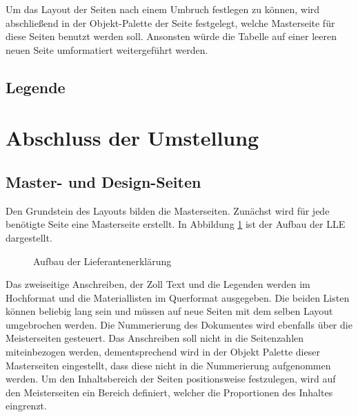 {\begin{figure}[ht]
\end{figure}

Um das Layout der Seiten nach einem Umbruch festlegen zu können, wird abschließend in der Objekt-Palette der Seite festgelegt, welche Masterseite für diese Seiten benutzt werden soll. Ansonsten würde die Tabelle auf einer leeren neuen Seite umformatiert weitergeführt werden.

\FloatBarrier
\subsection{Legende}


\section{Abschluss der Umstellung}




\FloatBarrier
\subsection{Master- und Design-Seiten}
\label{ch:tab}

Den Grundstein des Layouts bilden die Masterseiten. Zunächst wird für jede benötigte Seite eine Masterseite erstellt. In Abbildung \ref{figLLE} ist der Aufbau der \ac{LLE} dargestellt.

\begin{figure}[ht]
	\centering
	\caption{Aufbau der Lieferantenerklärung}
	\label{figLLE}
	
\end{figure}

Das zweiseitige Anschreiben, der Zoll Text und die Legenden werden im Hochformat und die Materiallisten im Querformat ausgegeben. Die beiden Listen können beliebig lang sein und müssen auf neue Seiten mit dem selben Layout umgebrochen werden.
Die Nummerierung des Dokumentes wird ebenfalls über die Meisterseiten gesteuert. Das Anschreiben soll nicht in die Seitenzahlen miteinbezogen werden, dementsprechend wird in der Objekt Palette dieser Masterseiten eingestellt, dass diese nicht in die Nummerierung aufgenommen werden. Um den Inhaltsbereich der Seiten positionsweise festzulegen, wird auf den Meisterseiten ein Bereich definiert, welcher die Proportionen des Inhaltes eingrenzt. 
  
}
